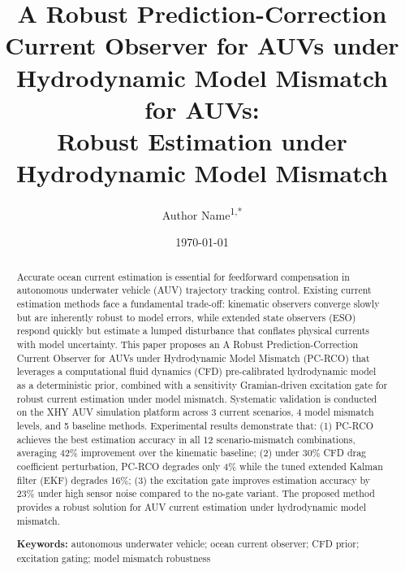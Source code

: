 \documentclass[12pt,a4paper]{article}
\title{\textbf{A Robust Prediction-Correction Current Observer for AUVs under Hydrodynamic Model Mismatch for AUVs:\\Robust Estimation under Hydrodynamic Model Mismatch}}
\author{Author Name\textsuperscript{1,*}}
\date{\today}
\begin{document}
\maketitle

\begin{abstract}
Accurate ocean current estimation is essential for feedforward compensation in autonomous underwater vehicle (AUV) trajectory tracking control. Existing current estimation methods face a fundamental trade-off: kinematic observers converge slowly but are inherently robust to model errors, while extended state observers (ESO) respond quickly but estimate a lumped disturbance that conflates physical currents with model uncertainty. This paper proposes an A Robust Prediction-Correction Current Observer for AUVs under Hydrodynamic Model Mismatch (PC-RCO) that leverages a computational fluid dynamics (CFD) pre-calibrated hydrodynamic model as a deterministic prior, combined with a sensitivity Gramian-driven excitation gate for robust current estimation under model mismatch. Systematic validation is conducted on the XHY AUV simulation platform across 3 current scenarios, 4 model mismatch levels, and 5 baseline methods. Experimental results demonstrate that: (1) PC-RCO achieves the best estimation accuracy in all 12 scenario-mismatch combinations, averaging 42\% improvement over the kinematic baseline; (2) under 30\% CFD drag coefficient perturbation, PC-RCO degrades only 4\% while the tuned extended Kalman filter (EKF) degrades 16\%; (3) the excitation gate improves estimation accuracy by 23\% under high sensor noise compared to the no-gate variant. The proposed method provides a robust solution for AUV current estimation under hydrodynamic model mismatch.

\textbf{Keywords:} autonomous underwater vehicle; ocean current observer; CFD prior; excitation gating; model mismatch robustness
\end{abstract}










\end{document}
